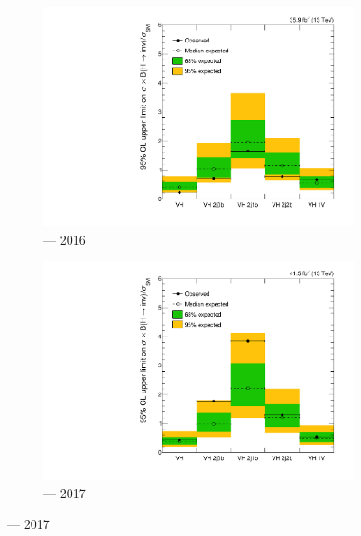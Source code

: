 \begin{figure}[htbp]
    \centering
    \begin{subfigure}[b]{0.45\textwidth}
        \includegraphics[width=\textwidth]{chapters/higgstoinv/figures/limits/VH/limit_2016_VH.pdf}
        \caption{\VH --- 2016}
    \end{subfigure}
    \hfill
    \begin{subfigure}[b]{0.45\textwidth}
        \includegraphics[width=\textwidth]{chapters/higgstoinv/figures/limits/VH/limit_2017_VH.pdf}
        \caption{\VH --- 2017}
    \end{subfigure}


\end{figure}
